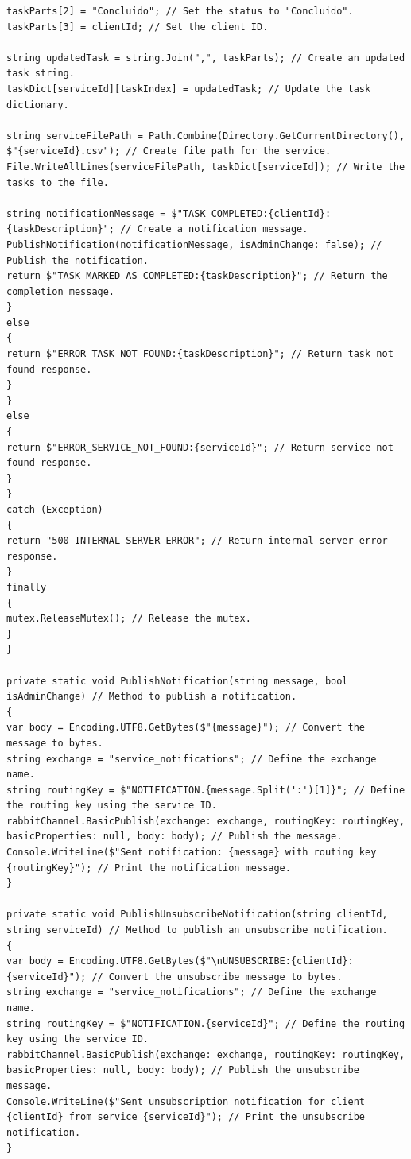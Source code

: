 \documentclass[12pt]{article}
\begin{document}
{\begin{verbatim}
taskParts[2] = "Concluido"; // Set the status to "Concluido".
taskParts[3] = clientId; // Set the client ID.

string updatedTask = string.Join(",", taskParts); // Create an updated task string.
taskDict[serviceId][taskIndex] = updatedTask; // Update the task dictionary.

string serviceFilePath = Path.Combine(Directory.GetCurrentDirectory(), $"{serviceId}.csv"); // Create file path for the service.
File.WriteAllLines(serviceFilePath, taskDict[serviceId]); // Write the tasks to the file.

string notificationMessage = $"TASK_COMPLETED:{clientId}: {taskDescription}"; // Create a notification message.
PublishNotification(notificationMessage, isAdminChange: false); // Publish the notification.
return $"TASK_MARKED_AS_COMPLETED:{taskDescription}"; // Return the completion message.
}
else
{
return $"ERROR_TASK_NOT_FOUND:{taskDescription}"; // Return task not found response.
}
}
else
{
return $"ERROR_SERVICE_NOT_FOUND:{serviceId}"; // Return service not found response.
}
}
catch (Exception)
{
return "500 INTERNAL SERVER ERROR"; // Return internal server error response.
}
finally
{
mutex.ReleaseMutex(); // Release the mutex.
}
}

private static void PublishNotification(string message, bool isAdminChange) // Method to publish a notification.
{
var body = Encoding.UTF8.GetBytes($"{message}"); // Convert the message to bytes.
string exchange = "service_notifications"; // Define the exchange name.
string routingKey = $"NOTIFICATION.{message.Split(':')[1]}"; // Define the routing key using the service ID.
rabbitChannel.BasicPublish(exchange: exchange, routingKey: routingKey, basicProperties: null, body: body); // Publish the message.
Console.WriteLine($"Sent notification: {message} with routing key {routingKey}"); // Print the notification message.
}

private static void PublishUnsubscribeNotification(string clientId, string serviceId) // Method to publish an unsubscribe notification.
{
var body = Encoding.UTF8.GetBytes($"\nUNSUBSCRIBE:{clientId}:{serviceId}"); // Convert the unsubscribe message to bytes.
string exchange = "service_notifications"; // Define the exchange name.
string routingKey = $"NOTIFICATION.{serviceId}"; // Define the routing key using the service ID.
rabbitChannel.BasicPublish(exchange: exchange, routingKey: routingKey, basicProperties: null, body: body); // Publish the unsubscribe message.
Console.WriteLine($"Sent unsubscription notification for client {clientId} from service {serviceId}"); // Print the unsubscribe notification.
}


\end{verbatim}}
\end{document}
